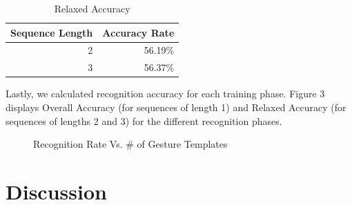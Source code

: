 \documentclass[twoside]{article}
\begin{document}
\begin{multicols}{2}
\begin{table}[H]
  \centering
  \caption{Relaxed Accuracy}
    \begin{tabular}{rr}
    \toprule
    Sequence Length & Accuracy Rate \\
    \midrule
    2     & 56.19\% \\
    3     & 56.37\% \\
    \bottomrule
    \end{tabular}%
  \label{tab:addlabel}%
\end{table}%

Lastly, we calculated recognition accuracy for each training phase. Figure 3
displays Overall Accuracy (for sequences of length 1) and Relaxed Accuracy (for
sequences of lengths 2 and 3) for the different recognition phases.

\begin{figure}[H]
\centering
{}	
	\caption{Recognition Rate Vs. \# of Gesture Templates}
	\label{fig3}
\end{figure}
\section{Discussion}



\end{multicols}
\end{document}
